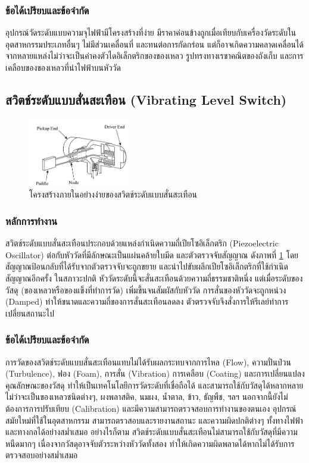 \documentclass[final,11pt,a4paper]{article}
\begin{document}
\subsubsection{ข้อได้เปรียบและข้อจำกัด}
อุปกรณ์วัดระดับแบบความจุไฟฟ้ามีโครงสร้างที่ง่าย มีราคาค่อนข้างถูกเมื่อเทียบกับเครื่องวัดระดับในอุตสาหกรรมประเภทอื่นๆ ไม่มีส่วนเคลื่อนที่ และทนต่อการกัดกร่อน
แต่ก็อาจเกิดความคลาดเคลื่อนได้จากหลายแหล่งไม่ว่าจะเป็นค่าคงตัวไดอิเล็กตริกของของเหลว รูปทรงทางเรขาคณิตของถังเก็บ และการเคลือบของของเหลวที่นำไฟฟ้าบนหัววัด
\subsection{สวิตช์ระดับแบบสั่นสะเทือน (Vibrating Level Switch)}
\begin{figure}[h]
    \centering
    \includegraphics[width=0.4\textwidth]{images/Screenshot_11.jpg}
    \caption{โครงสร้างภายในอย่างง่ายของสวิตช์ระดับแบบสั่นสะเทือน}
    \label{fig:vls}
\end{figure}
\subsubsection{หลักการทำงาน}
สวิตช์ระดับแบบสั่นสะเทือนประกอบด้วยแหล่งกำเนิดความถี่เปียโซอิเล็กตริก (Piezoelectric Oscillator) ต่อกับหัววัดที่มีลักษณะเป็นแผ่นคล้ายใบมีด 
และตัวตรวจจับสัญญาณ ดังภาพที่ \ref{fig:vls} โดยสัญญาณป้อนกลับที่ได้รับจากตัวตรวจจับจะถูกขยาย และนำไปขับผลึกเปียโซอิเล็กตริกที่ใช้กำเนิดสัญญาณอีกครั้ง
ในสภาวะปกติ หัววัดระดับนี้จะสั่นสะเทือนด้วยความถี่ธรรมชาติหนึ่ง แต่เมื่อระดับของวัสดุ (ของเหลวหรือของแข็งที่ทำการวัด) เพิ่มขึ้นจนสัมผัสกับหัววัด 
การสั่นของหัววัดจะถูกหน่วง (Damped) ทำให้ขนาดและความถี่ของการสั่นสะเทือนลดลง ตัวตรวจจับจึงสั่งการให้รีเลย์ทำการเปลี่ยนสถานะไป

\subsubsection{ข้อได้เปรียบและข้อจำกัด}
การวัดของสวิตช์ระดับแบบสั่นสะเทือนแทบไม่ได้รับผลกระทบจากการไหล (Flow), ความปั่นป่วน (Turbulence), ฟอง (Foam), การสั่น (Vibration)
การเคลือบ (Coating) และการเปลี่ยนแปลงคุณลักษณะของวัสดุ ทำให้เป็นเทคโนโลยีการวัดระดับที่เชื่อถือได้ และสามารถใช้กับวัสดุได้หลากหลาย ไม่ว่าจะเป็นของเหลวชนิดต่างๆ,
ผงพลาสติค, นมผง, น้ำตาล, ข้าว, ธัญพืช, ฯลฯ นอกจากนี้ยังไม่ต้องการการปรับเทียบ (Calibration) และมีความสามารถตรวจสอบการทำงานของตนเอง อุปกรณ์สมัยใหม่ที่ใช้ในอุตสาหกรรม 
สามารถตรวสอบและรายงานสถานะ และความผิดปกติต่างๆ ทั้งทางไฟฟ้าและทางกลได้อย่างสม่ำเสมอ อย่างไรก็ตาม 
สวิตช์ระดับแบบสั่นสะเทือนไม่สามารถใช้กับวัสดุที่มีความหนืดมากๆ เนื่องจากวัสดุอาจจับตัวระหว่างหัววัดทั้งสอง ทำให้เกิดความผิดพลาดได้หากไม่ได้รับการตรวจสอบอย่างสม่ำเสมอ 
\end{document}

